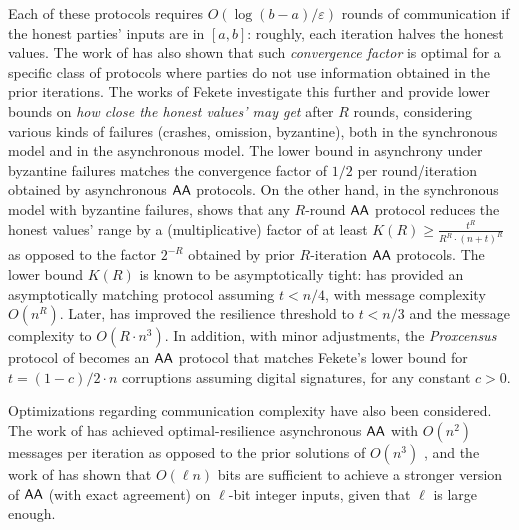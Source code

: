 Each of these protocols requires $O(\log(b - a) / \varepsilon)$ rounds of communication if the honest parties' inputs are in $[a, b]$: roughly, each iteration halves the honest values. The work of \cite{JACM:DLPSW86} has also shown that such \emph{convergence factor} is optimal for a specific class of protocols where parties do not use information obtained in the prior iterations. The works of Fekete \cite{Fekete90,FeketeFixed87} investigate this further and provide lower bounds on \emph{how close the honest values' may get} after $R$ rounds, considering various kinds of failures (crashes, omission, byzantine), both in the synchronous model and in the asynchronous model. The lower bound in asynchrony under byzantine failures matches the convergence factor of $1/2$ per round/iteration obtained by asynchronous $\textsf{AA}$ protocols. On the other hand, in the synchronous model with byzantine failures, \cite{Fekete90} shows that any $R$-round $\textsf{AA}$ protocol reduces the honest values' range by a (multiplicative) factor of at least $K(R) \geq \frac{t^R}{R^R \cdot (n + t)^R}$ as opposed to the factor $2^{-R}$ obtained by prior $R$-iteration $\textsf{AA}$ protocols. The lower bound $K(R)$ is known to be asymptotically tight: \cite{Fekete90} has provided an asymptotically matching protocol assuming $t < n / 4$, with message complexity $O(n^R)$. Later, \cite{BenDoHo10} has improved the resilience threshold to $t < n / 3$ and the message complexity to $O(R \cdot n^3)$. In addition, with minor adjustments, the \emph{Proxcensus} protocol of \cite{EUROCRYPT:GhGoLi22} becomes an $\textsf{AA}$ protocol that matches Fekete's lower bound for $t = (1 - c)/2 \cdot n$ corruptions assuming digital signatures, for any constant $c > 0$.

Optimizations regarding communication complexity have also been considered. The work of \cite{MoseArxivNew} has achieved optimal-resilience asynchronous $\textsf{AA}$ with $O(n^2)$ messages per iteration as opposed to the prior solutions of $O(n^3)$ \cite{OPODIS:AAD04}, and the work of \cite{PODC:GhLiWa24} has shown that $O(\ell n)$ bits are sufficient to achieve a stronger version of $\textsf{AA}$ (with exact agreement) on $\ell$-bit integer inputs, given that $\ell$ is large enough.


